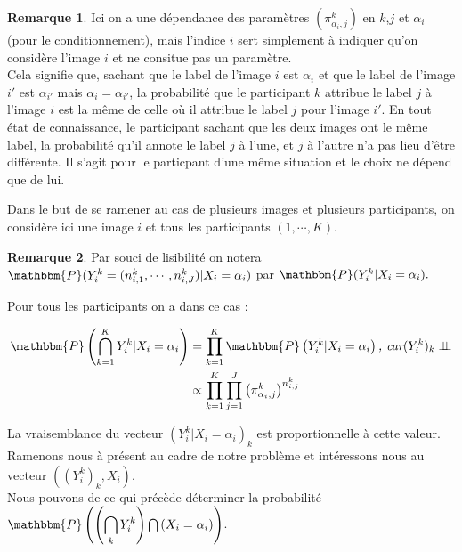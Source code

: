 \documentclass[frenchb]{report}
\newcommand{\1}{\mathbbm{1}}
\newcommand{\prob}{\mathbbm{P}}
\newcommand{\indep}{\perp \!\!\! \perp}
\theoremstyle{definition}\newtheorem{defn}{Définition}
\theoremstyle{definition}\newtheorem{exm}{Exemple}
\theoremstyle{definition}\newtheorem{nota}{Notation}
\theoremstyle{definition}\newtheorem{rem}{Remarque}
\begin{document}
\begin{rem}
	Ici on a une dépendance des paramètres $(\pi^k_{\alpha_i,j})$ en $k$,$j$ et $\alpha_i$ (pour le conditionnement), mais l'indice $i$ sert simplement à indiquer qu'on considère l'image $i$ et ne consitue pas un paramètre.\\
	Cela signifie que, sachant que le label de l'image $i$ est $\alpha_i$ et que le label de l'image $i'$ est $\alpha_{i'}$ mais $\alpha_i = \alpha_{i'}$, la probabilité que le participant $k$ attribue le label $j$ à l'image $i$ est la même de celle où il attribue le label $j$ pour l'image $i'$. 
	En tout état de connaissance, le participant sachant que les deux images ont le même label, la probabilité qu'il annote le label $j$ à l'une, et $j$ à l'autre n'a pas lieu d'être différente. Il s'agit pour le particpant d'une même situation et le choix ne dépend que de lui. 
\end{rem}
\bigskip


Dans le but de se ramener au cas de plusieurs images et plusieurs participants, on considère ici une image $i$ et tous les participants $(1, \cdots, K)$.\\

\begin{rem}
	Par souci de lisibilité on notera $\prob(Y^k_i = (n^k_{i,1}, \cdots, n^k_{i,J})|X_i = \alpha_i)$ par $\prob(Y^k_i|X_i = \alpha_i).$
\end{rem}

Pour tous les participants on a dans ce cas : 
\begin{center}
	\begin{align*}
		\prob \left( \displaystyle \bigcap_{k=1}^K Y^k_i |X_i =\alpha_i \right) &= \displaystyle \prod_{k=1}^K \prob \left(Y^k_i |X_i = \alpha_i \right) \textit{, car} (Y^k_i)_k \indep\\
	&\propto \displaystyle \prod_{k=1}^K \displaystyle \prod_{j = 1}^J \left(\pi^k_{\alpha_i,j}\right)^{n^k_{i,j}}\\
	\end{align*}
\end{center}

La vraisemblance du vecteur $(Y^k_i | X_i = \alpha_i)_k$ est proportionnelle à cette valeur.\\

Ramenons nous à présent au cadre de notre problème et intéressons nous au vecteur $((Y^k_i)_k, X_i)$.\\
Nous pouvons de ce qui précède déterminer la probabilité $\prob \left( \left( \displaystyle \bigcap_k Y^k_i \right) \bigcap \left(X_i = \alpha_i \right) \right)$.\\
\end{document}
